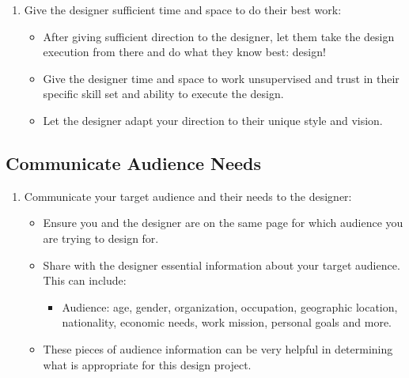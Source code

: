\documentclass[
]{book}
\providecommand{\tightlist}{%
  \setlength{\itemsep}{0pt}\setlength{\parskip}{0pt}}
\begin{document}
\begin{enumerate}
\def\labelenumi{\arabic{enumi}.}
\setcounter{enumi}{3}
\tightlist
\item
  Give the designer sufficient time and space to do their best work:

  \begin{itemize}
  \tightlist
  \item
    After giving sufficient direction to the designer, let them take the design execution from there and do what they know best: design!
  \item
    Give the designer time and space to work unsupervised and trust in their specific skill set and ability to execute the design.
  \item
    Let the designer adapt your direction to their unique style and vision.
  \end{itemize}
\end{enumerate}

\hypertarget{communicate-audience-needs}{%
\subsection{Communicate Audience Needs}\label{communicate-audience-needs}}

\begin{enumerate}
\def\labelenumi{\arabic{enumi}.}
\tightlist
\item
  Communicate your target audience and their needs to the designer:

  \begin{itemize}
  \tightlist
  \item
    Ensure you and the designer are on the same page for which audience you are trying to design for.
  \item
    Share with the designer essential information about your target audience. This can include:

    \begin{itemize}
    \tightlist
    \item
      Audience: age, gender, organization, occupation, geographic location, nationality, economic needs, work mission, personal goals and more.
    \end{itemize}
  \item
    These pieces of audience information can be very helpful in determining what is appropriate for this design project.
  \end{itemize}
\end{enumerate}
\end{document}
